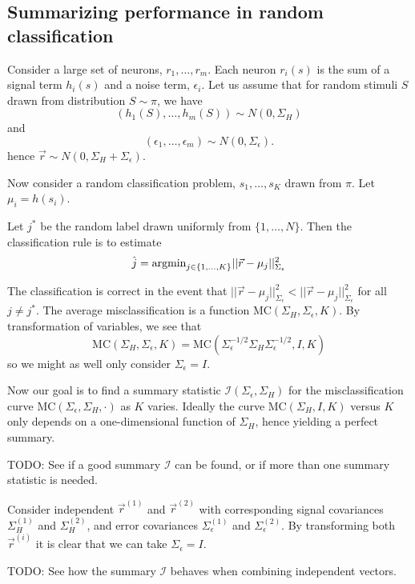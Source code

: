 \documentclass[12pt]{article}
\begin{document}
\subsection{Summarizing performance in random classification}

Consider a large set of neurons, $r_1,\hdots, r_m$.  Each neuron
$r_i(s)$ is the sum of a signal term $h_i(s)$ and a noise term,
$\epsilon_i$.  Let us assume that for random stimuli $S$ drawn from
distribution $S \sim \pi$, we have
\[
(h_1(S),\hdots, h_m(S)) \sim N(0, \Sigma_H)
\]
and
\[
(\epsilon_1,\hdots, \epsilon_m) \sim N(0, \Sigma_\epsilon).
\]
hence $\vec{r} \sim N(0, \Sigma_H + \Sigma_\epsilon).$

Now consider a random classification problem, $s_1,\hdots, s_K$ drawn
from $\pi$.  Let $\mu_i = h(s_i)$.

Let $j^*$ be the random label drawn uniformly from $\{1,\hdots,
N\}$. Then the classification rule is to estimate
\[
\hat{j} = \text{argmin}_{j \in \{1, \hdots, K\}} ||\vec{r} - \mu_j||^2_{\Sigma_\epsilon}
\]

The classification is correct in the event that $||\vec{r}
- \mu_j||_{\Sigma_\epsilon}^2 < ||\vec{r}
- \mu_j||_{\Sigma_\epsilon}^2$ for all $j \neq j^*$.  The average
misclassification is a function $\text{MC}(\Sigma_H, \Sigma_\epsilon,
K)$.  By transformation of variables, we see that
\[
\text{MC}(\Sigma_H, \Sigma_\epsilon, K) = \text{MC}(\Sigma_\epsilon^{-1/2}\Sigma_H\Sigma_\epsilon^{-1/2}, I, K)
\]
so we might as well only consider $\Sigma_\epsilon = I$.

Now our goal is to find a summary statistic
$\mathcal{I}(\Sigma_\epsilon, \Sigma_H)$ for the misclassification
curve $\text{MC}(\Sigma_\epsilon, \Sigma_H, \cdot)$ as $K$ varies.
Ideally the curve $\text{MC}(\Sigma_H, I, K)$ versus $K$ only depends
on a one-dimensional function of $\Sigma_H$, hence yielding a perfect
summary.

TODO: See if a good summary $\mathcal{I}$ can be found, or if more
than one summary statistic is needed.

Consider independent $\vec{r}^{(1)}$ and $\vec{r}^{(2)}$ with
corresponding signal covariances $\Sigma_H^{(1)}$ and
$\Sigma_H^{(2)}$, and error covariances $\Sigma_\epsilon^{(1)}$ and
$\Sigma_\epsilon^{(2)}$.  By transforming both $\vec{r}^{(i)}$ it is
clear that we can take $\Sigma_\epsilon = I$.

TODO: See how the summary $\mathcal{I}$  behaves when combining independent vectors.
\end{document}
